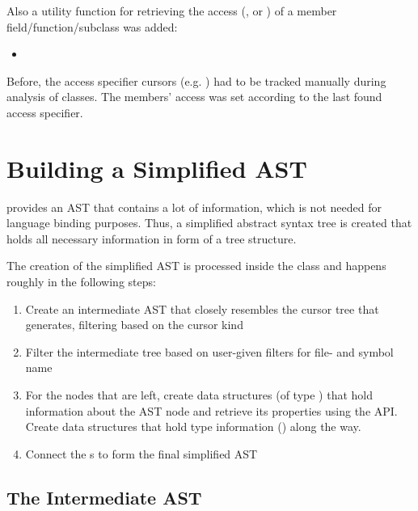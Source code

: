 Also a utility function for retrieving the access (,  or ) of a  member field/function/subclass was added:

\vspace{-10pt}
\begin{itemize}\addtolength{\itemsep}{-0.5\baselineskip}
\item {}
\end{itemize}
\vspace{-10pt}

Before, the  access specifier cursors (e.g. ) had to be tracked manually during analysis of classes. The members' access was set according to the last found access specifier.

\section{Building a Simplified AST}

 provides an AST that contains a lot of information, which is not needed for language binding purposes. Thus, a simplified abstract syntax tree is created that holds all necessary information in form of a tree structure.

The creation of the simplified AST is processed inside the  class and happens roughly in the following steps:

\begin{enumerate}\addtolength{\itemsep}{-0.5\baselineskip}
\item Create an intermediate AST that closely resembles the cursor tree that  generates, filtering based on the cursor kind
\item Filter the intermediate tree based on user-given filters for file- and symbol name
\item For the nodes that are left, create data structures (of type ) that hold information about the AST node and retrieve its properties using the  API. Create data structures that hold type information () along the way.
\item Connect the s to form the final simplified AST 
\end{enumerate}

\subsection{The Intermediate AST}

